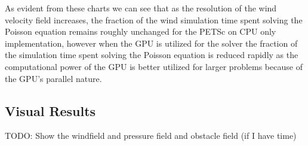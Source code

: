 As evident from these charts we can see that as the resolution of the wind
velocity field increases, the fraction of the wind simulation time spent solving
the Poisson equation remains roughly unchanged for the PETSc on CPU only
implementation, however when the GPU is utilized for the solver the fraction of
the simulation time spent solving the Poisson equation is reduced rapidly as
the computational power of the GPU is better utilized for larger problems because
of the GPU's parallel nature.

\subsection{Visual Results}

TODO: Show the windfield and pressure field and obstacle field (if I have time)
